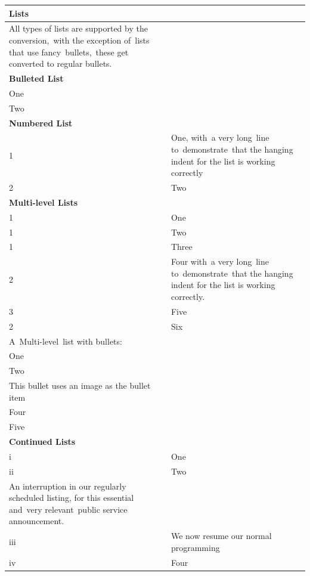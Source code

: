 \documentclass[\officeparserdriver 12pt]{article}
\begin{document}
\begin{longtable}{|*{2}{>{\raggedright\arraybackslash}p{\dimexpr(\linewidth-4\tabcolsep-3\arrayrulewidth)/2\relax}|}}
\hline
\textcolor{hex365F91}{\textbf{{\fontsize{14pt}{16.8pt}\selectfont Lists~}}} &  \\
\hline
\endhead
All types of lists are supported by the conversion,~with the exception of~lists that use fancy~bullets,~these get converted to regular bullets.~ &  \\
\hline
\textcolor{hex4F81BD}{\textbf{{\fontsize{13pt}{15.6pt}\selectfont Bulleted List~}}} &  \\
\hline
One~ &  \\
\hline
Two~ &  \\
\hline
\textcolor{hex4F81BD}{\textbf{{\fontsize{13pt}{15.6pt}\selectfont Numbered List~}}} &  \\
\hline
\textcolor{hex000000}{1} & One, with~a very long~line to~demonstrate~that the hanging indent for the list is working correctly~ \\
\hline
\textcolor{hex000000}{2} & Two~ \\
\hline
\textcolor{hex4F81BD}{\textbf{{\fontsize{13pt}{15.6pt}\selectfont Multi-level Lists~}}} &  \\
\hline
\textcolor{hex000000}{1} & One~ \\
\hline
\textcolor{hex000000}{1} & Two~ \\
\hline
\textcolor{hex000000}{1} & Three~ \\
\hline
\textcolor{hex000000}{2} & Four with~a very long~line to~demonstrate~that the hanging indent for the list is working correctly.~ \\
\hline
\textcolor{hex000000}{3} & Five~ \\
\hline
\textcolor{hex000000}{2} & Six~ \\
\hline
A~Multi-level~list with bullets:~ &  \\
\hline
One~ &  \\
\hline
Two~ &  \\
\hline
This bullet uses an image as the bullet item~ &  \\
\hline
Four~ &  \\
\hline
Five~ &  \\
\hline
\textcolor{hex4F81BD}{\textbf{{\fontsize{13pt}{15.6pt}\selectfont Continued Lists~}}} &  \\
\hline
\textcolor{hex000000}{i} & One~ \\
\hline
\textcolor{hex000000}{ii} & Two~ \\
\hline
An interruption in our regularly scheduled listing, for this essential and~very relevant~public service announcement.~ &  \\
\hline
\textcolor{hex000000}{iii} & We now resume our normal programming~ \\
\hline
\textcolor{hex000000}{iv} & Four~ \\
\hline
\end{longtable}
\end{document}
